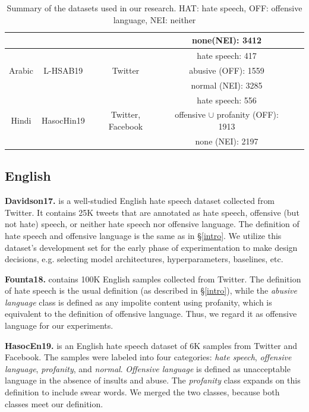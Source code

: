 \documentclass[11pt]{article}
\begin{document}
\begin{table}[ht!]
{\begin{tabular}{|c|c|c|c|c|}
				\cline{4-4}
				~ & ~ & ~ & none(NEI): 3412 & ~ \\
				\hline
				\multirow{3}{*}{Arabic} & \multirow{3}{*}{L-HSAB19} & \multirow{3}{*}{Twitter} & hate speech: 417 &  \multirow{3}{*}{\citealt{mulki-etal-2019-l}} \\
				\cline{4-4}
				~& ~ & ~ & abusive (OFF): 1559 & ~ \\
				\cline{4-4}
				~ & ~ & ~ & normal (NEI): 3285 & ~ \\
				\hline
				\multirow{3}{*}{Hindi} & \multirow{3}{*}{HasocHin19} & \multirow{3}{*}{Twitter, Facebook} & hate speech: 556 &  \multirow{3}{*}{\citealt{mandl2019overview}} \\
				\cline{4-4}
				~& ~ & ~ & offensive $\cup$ profanity (OFF): 1913 & ~ \\
				\cline{4-4}
				~ & ~ & ~ & none (NEI): 2197 & ~ \\
				\hline
		\end{tabular}}
		\caption{Summary of the datasets used in our research. HAT: hate speech, OFF: offensive language, NEI: neither}
		\label{data_summary}
	\end{table}
	
	
	\subsection{English}
	\textbf{Davidson17.} \citet{davidson} is a well-studied English hate speech dataset collected from Twitter. It contains 25K tweets that are annotated as hate speech, offensive (but not hate) speech, or neither hate speech nor offensive language. The definition of hate speech and offensive language is the same as in \S\ref{intro}. We utilize this dataset's development set for the early phase of experimentation to make design decisions, e.g. selecting model architectures, hyperparameters, baselines, etc.
	
	\textbf{Founta18.} \citet{founta} contains 100K English samples collected from Twitter. The definition of hate speech is the usual definition (as described in \S\ref{intro}), while the \textit{abusive language} class is defined as any impolite content using profanity, which is equivalent to the definition of offensive language. Thus, we regard it as offensive language for our experiments.
	
	\textbf{HasocEn19.} \citet{mandl2019overview} is an English hate speech dataset of 6K samples from Twitter and Facebook. The samples were labeled into four categories: \textit{hate speech}, \textit{offensive language}, \textit{profanity}, and \textit{normal}. \textit{Offensive language} is defined as unacceptable language in the absence of insults and abuse. The \textit{profanity} class expands on this definition to include swear words. We merged the two classes, because both classes meet our definition.
	
\end{document}
